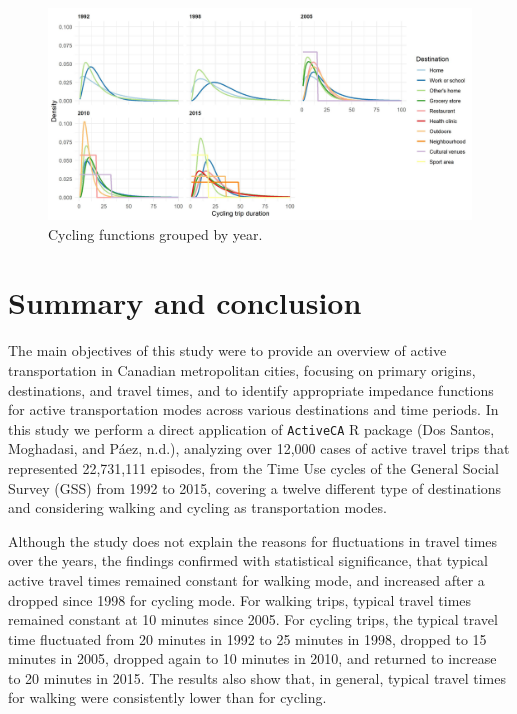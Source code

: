 \documentclass[preprint, 3p,
authoryear]{elsarticle} %
\begin{document}
\begin{figure}

{\centering \includegraphics[width=1\linewidth]{figures/cycling_functions_by_year} 

}

\caption{Cycling functions grouped by year.}\label{fig:cycling-function-by-year-fig}
\end{figure}

\section{Summary and conclusion}\label{summary-and-conclusion}

The main objectives of this study were to provide an overview of active
transportation in Canadian metropolitan cities, focusing on primary
origins, destinations, and travel times, and to identify appropriate
impedance functions for active transportation modes across various
destinations and time periods. In this study we perform a direct
application of \texttt{ActiveCA} R package (Dos Santos, Moghadasi, and
Páez, n.d.), analyzing over 12,000 cases of active travel trips that
represented 22,731,111 episodes, from the Time Use cycles of the General
Social Survey (GSS) from 1992 to 2015, covering a twelve different type
of destinations and considering walking and cycling as transportation
modes.

Although the study does not explain the reasons for fluctuations in
travel times over the years, the findings confirmed with statistical
significance, that typical active travel times remained constant for
walking mode, and increased after a dropped since 1998 for cycling mode.
For walking trips, typical travel times remained constant at 10 minutes
since 2005. For cycling trips, the typical travel time fluctuated from
20 minutes in 1992 to 25 minutes in 1998, dropped to 15 minutes in 2005,
dropped again to 10 minutes in 2010, and returned to increase to 20
minutes in 2015. The results also show that, in general, typical travel
times for walking were consistently lower than for cycling.
\end{document}

